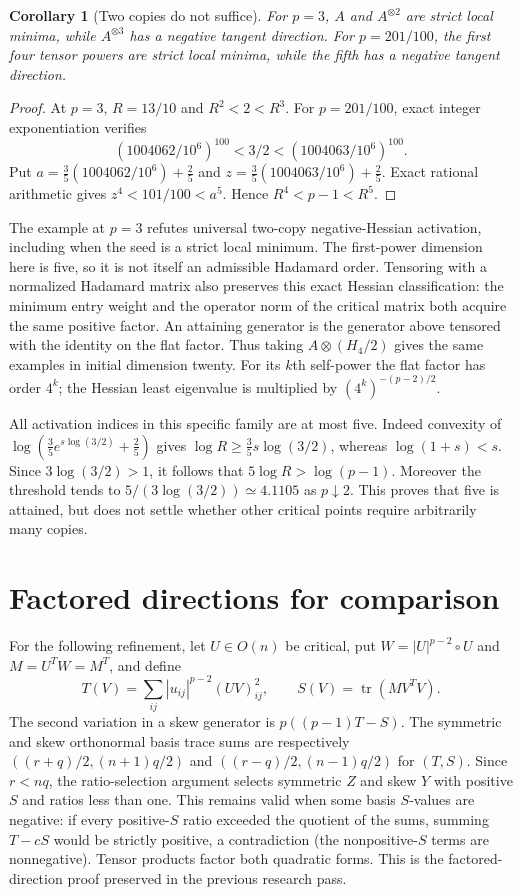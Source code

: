 \documentclass[11pt]{article}
\newtheorem{corollary}[theorem]{Corollary}
\newcommand{\tr}{\operatorname{tr}}
\begin{document}
\begin{corollary}[Two copies do not suffice]
For $p=3$, $A$ and $A^{\otimes2}$ are strict local minima, while
$A^{\otimes3}$ has a negative tangent direction. For $p=201/100$,
the first four tensor powers are strict local minima, while the fifth
has a negative tangent direction.
\end{corollary}
\begin{proof}
At $p=3$, $R=13/10$ and $R^2<2<R^3$.
For $p=201/100$, exact integer exponentiation verifies
\[
 (1004062/10^6)^{100}<3/2<(1004063/10^6)^{100}.
\]
Put $a=\frac35(1004062/10^6)+\frac25$ and
$z=\frac35(1004063/10^6)+\frac25$. Exact rational arithmetic gives
$z^4<101/100<a^5$. Hence $R^4<p-1<R^5$.
\end{proof}

The example at $p=3$ refutes universal two-copy negative-Hessian
activation, including when the seed is a strict local minimum.
The first-power dimension here is five, so it is not itself an
admissible Hadamard order. Tensoring with a normalized Hadamard matrix
also preserves this exact Hessian classification: the minimum entry
weight and the operator norm of the critical matrix both acquire
the same positive factor. An attaining generator is the generator
above tensored with the identity on the flat factor. Thus taking
$A\otimes(H_4/2)$ gives the same examples in initial dimension twenty.
For its $k$th self-power the flat factor has order $4^k$; the Hessian
least eigenvalue is multiplied by $(4^k)^{-(p-2)/2}$.

All activation indices in this specific family are at most five.
Indeed convexity of $\log(\frac35e^{s\log(3/2)}+\frac25)$ gives
$\log R\ge\frac35s\log(3/2)$, whereas $\log(1+s)<s$.
Since $3\log(3/2)>1$, it follows that $5\log R>\log(p-1)$.
Moreover the threshold tends to $5/(3\log(3/2))\simeq4.1105$ as
$p\downarrow2$. This proves that five is attained, but does not
settle whether other critical points require arbitrarily many copies.

\section{Factored directions for comparison}
For the following refinement, let $U\in O(n)$ be critical, put
$W=|U|^{p-2}\circ U$ and $M=U^TW=M^T$, and define
\[
 T(V)=\sum_{ij}|u_{ij}|^{p-2}(UV)_{ij}^2,
 \qquad S(V)=\tr(MV^TV).
\]
The second variation in a skew generator is $p((p-1)T-S)$.
The symmetric and skew orthonormal basis trace sums are respectively
$((r+q)/2,(n+1)q/2)$ and $((r-q)/2,(n-1)q/2)$ for $(T,S)$.
Since $r<nq$, the ratio-selection argument selects symmetric $Z$ and
skew $Y$ with positive $S$ and ratios less than one. This remains
valid when some basis $S$-values are negative: if every positive-$S$
ratio exceeded the quotient of the sums, summing $T-cS$ would be
strictly positive, a contradiction (the nonpositive-$S$ terms are
nonnegative). Tensor products factor both quadratic forms. This is
the factored-direction proof preserved in the previous research pass.
\end{document}
